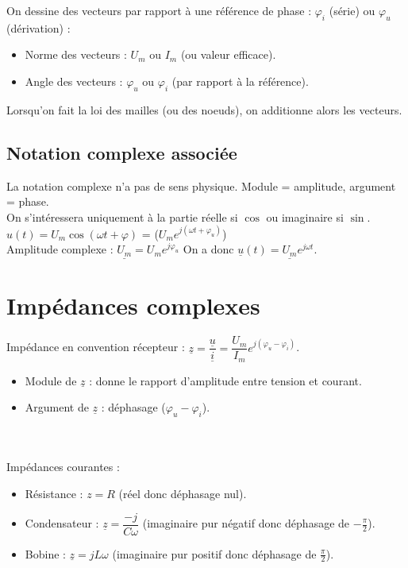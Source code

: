 \documentclass[13pt, twoside, a4paper, french]{report}
\begin{document}
    \vspace{5pt}
    On dessine des vecteurs par rapport à une référence de phase : $\varphi_i$ (série) ou $\varphi_u$ (dérivation) :
    \begin{itemize}
        \item Norme des vecteurs : $U_m$ ou $I_m$ (ou valeur efficace).
        \item Angle des vecteurs : $\varphi_u$ ou $\varphi_i$ (par rapport à la référence).
    \end{itemize}
    \vspace{5pt}
    Lorsqu'on fait la loi des mailles (ou des noeuds), on additionne alors les vecteurs.

    \subsection{Notation complexe associée}\label{subsec:notation-complexe-associée}

    La notation complexe n'a pas de sens physique.
    Module = amplitude, argument = phase.\\
    On s'intéressera uniquement à la partie réelle si $\cos$ ou imaginaire si $\sin$.\\

    $u(t) = U_m \cos(\omega t + \varphi)$ = \Re($U_m e^{j(\omega t + \varphi_u)}$)\\

    Amplitude complexe : $\underline{U_m} = U_m e^{j\varphi_u}$ \quad On a donc $\underline{u}(t) = \underline{U_m} e^{j\omega t}$.


    \section{Impédances complexes}\label{sec:impedances-complexes}

    Impédance en convention récepteur : $\underline{z} = \dfrac{\underline{u}}{\underline{i}} = \dfrac{U_m}{I_m} e^{j(\varphi_u - \varphi_i)}$.\\

    \begin{itemize}
        \item Module de $\underline{z}$ : donne le rapport d'amplitude entre tension et courant.
        \item Argument de $\underline{z}$ : déphasage ($\varphi_u - \varphi_i$).
    \end{itemize}
    \\ \vspace{7pt}\\
    Impédances courantes :
    \begin{itemize}
        \item Résistance : $z = R$ (réel donc déphasage nul).
        \item Condensateur : $\underline{z} = \dfrac{-j}{C \omega}$ (imaginaire pur négatif donc déphasage de $-\frac{\pi}{2}$).
        \item Bobine : $\underline{z} = jL \omega$ (imaginaire pur positif donc déphasage de $\frac{\pi}{2}$).
    \end{itemize}
\end{document}
